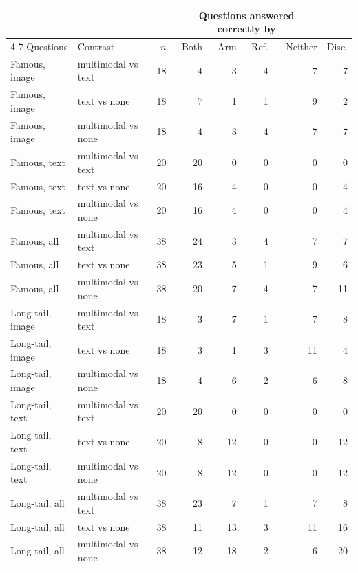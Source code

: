 \begin{tabular}{llrrrrrr}
\toprule
& & & \multicolumn{4}{c}{Questions answered correctly by} & \\
\cmidrule(lr){4-7}
Questions & Contrast & $n$ & Both & Arm & Ref. & Neither & Disc. \\
\midrule
Famous, image & multimodal vs text & 18 & 4 & 3 & 4 & 7 & 7 \\
Famous, image & text vs none & 18 & 7 & 1 & 1 & 9 & 2 \\
Famous, image & multimodal vs none & 18 & 4 & 3 & 4 & 7 & 7 \\
Famous, text & multimodal vs text & 20 & 20 & 0 & 0 & 0 & 0 \\
Famous, text & text vs none & 20 & 16 & 4 & 0 & 0 & 4 \\
Famous, text & multimodal vs none & 20 & 16 & 4 & 0 & 0 & 4 \\
Famous, all & multimodal vs text & 38 & 24 & 3 & 4 & 7 & 7 \\
Famous, all & text vs none & 38 & 23 & 5 & 1 & 9 & 6 \\
Famous, all & multimodal vs none & 38 & 20 & 7 & 4 & 7 & 11 \\
Long-tail, image & multimodal vs text & 18 & 3 & 7 & 1 & 7 & 8 \\
Long-tail, image & text vs none & 18 & 3 & 1 & 3 & 11 & 4 \\
Long-tail, image & multimodal vs none & 18 & 4 & 6 & 2 & 6 & 8 \\
Long-tail, text & multimodal vs text & 20 & 20 & 0 & 0 & 0 & 0 \\
Long-tail, text & text vs none & 20 & 8 & 12 & 0 & 0 & 12 \\
Long-tail, text & multimodal vs none & 20 & 8 & 12 & 0 & 0 & 12 \\
Long-tail, all & multimodal vs text & 38 & 23 & 7 & 1 & 7 & 8 \\
Long-tail, all & text vs none & 38 & 11 & 13 & 3 & 11 & 16 \\
Long-tail, all & multimodal vs none & 38 & 12 & 18 & 2 & 6 & 20 \\
\bottomrule
\end{tabular}
